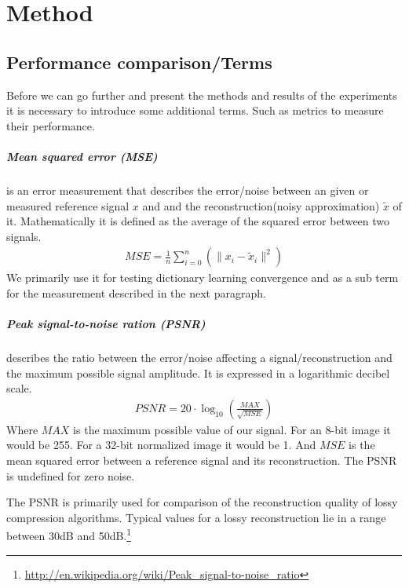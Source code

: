 \chapter{Method}


\section{Performance comparison/Terms}

Before we can go further and present the methods and results of the experiments
it is necessary to introduce some additional terms. 
Such as metrics to measure their performance.


\paragraph{Mean squared error (MSE)} is an error measurement that
describes the error/noise between an given or measured reference signal $x$
and  and the reconstruction(noisy approximation) $\tilde{x}$ of it.
Mathematically it is defined as the average of the squared error between two
signals.
\begin{align}
 MSE = \frac{1}{n} \sum_{i=0}^{n} \left( {\lVert x_i -
\tilde{x}_i\rVert^{2}}\right)
\end{align}
We primarily use it for testing dictionary learning convergence and as a
sub term for the measurement described in the next paragraph.

\paragraph{Peak signal-to-noise ration (PSNR)} describes the ratio between the
error/noise affecting a signal/reconstruction and the maximum possible signal
amplitude. It is expressed in a logarithmic decibel scale.
\begin{align}
 PSNR = 20 \cdot \log_{10} \left(\frac{MAX}{\sqrt{MSE}}\right)
\end{align}
Where $MAX$ is the maximum possible value of our signal. For an 8-bit
image it would be 255. For a 32-bit normalized image it would be 1. And $MSE$ is
the mean squared error between a reference signal and its reconstruction. The
PSNR is undefined for zero noise.

The PSNR is primarily used for comparison of the reconstruction quality of
lossy compression algorithms. Typical values for a lossy reconstruction lie in
a range between 30dB and
50dB.\footnote{\url{http://en.wikipedia.org/wiki/Peak_signal-to-noise_ratio}}


